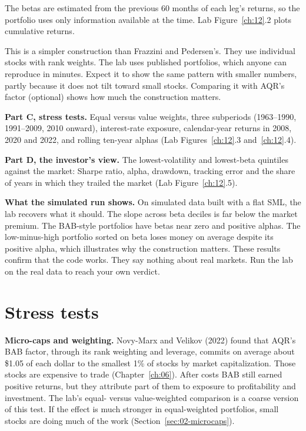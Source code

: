 The betas are estimated from the previous 60 months of each leg's returns, so the portfolio uses only information available at the time. Lab Figure~\ref{ch:12}.2 plots cumulative returns.

This is a simpler construction than Frazzini and Pedersen's. They use individual stocks with rank weights. The lab uses published portfolios, which anyone can reproduce in minutes. Expect it to show the same pattern with smaller numbers, partly because it does not tilt toward small stocks. Comparing it with AQR's factor (optional) shows how much the construction matters.

\textbf{Part C, stress tests.} Equal versus value weights, three subperiods (1963--1990, 1991--2009, 2010 onward), interest-rate exposure, calendar-year returns in 2008, 2020 and 2022, and rolling ten-year alphas (Lab Figures~\ref{ch:12}.3 and~\ref{ch:12}.4).

\textbf{Part D, the investor's view.} The lowest-volatility and lowest-beta quintiles against the market: Sharpe ratio, alpha, drawdown, tracking error and the share of years in which they trailed the market (Lab Figure~\ref{ch:12}.5).

\textbf{What the simulated run shows.} On simulated data built with a flat SML, the lab recovers what it should. The slope across beta deciles is far below the market premium. The BAB-style portfolios have betas near zero and positive alphas. The low-minus-high portfolio sorted on beta loses money on average despite its positive alpha, which illustrates why the construction matters. These results confirm that the code works. They say nothing about real markets. Run the lab on the real data to reach your own verdict.

\section{Stress tests}
\label{sec:12-stress}

\textbf{Micro-caps and weighting.} Novy-Marx and Velikov (2022) found that AQR's BAB factor, through its rank weighting and leverage, commits on average about \$1.05 of each dollar to the smallest 1\% of stocks by market capitalization. Those stocks are expensive to trade (Chapter~\ref{ch:06}). After costs BAB still earned positive returns, but they attribute part of them to exposure to profitability and investment. The lab's equal- versus value-weighted comparison is a coarse version of this test. If the effect is much stronger in equal-weighted portfolios, small stocks are doing much of the work (Section~\ref{sec:02-microcaps}).

